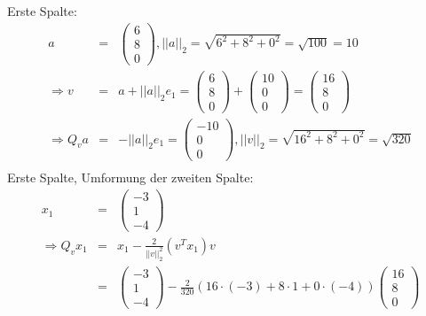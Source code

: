 \documentclass[11pt]{article} %
\begin{document}
\begin{enumerate}[a)]
Erste Spalte:
\begin{eqnarray*}
a &=& \begin{pmatrix} 6 \\ 8 \\ 0 \end{pmatrix}, ||a||_2 = \sqrt{6^2 + 8^2 + 0^2}  = \sqrt{100} =  10 \\
\Rightarrow  v &=& a + ||a||_2e_1 = \begin{pmatrix} 6 \\ 8 \\ 0 \end{pmatrix} +  \begin{pmatrix}  10 \\ 0 \\ 0 \end{pmatrix} = \begin{pmatrix} 16 \\ 8 \\ 0 \end{pmatrix} \\
\Rightarrow Q_va &=& -||a||_2e_1 =\begin{pmatrix}  -10 \\ 0 \\ 0 \end{pmatrix}, ||v||_2 = \sqrt{16^2 + 8^2 + 0^2} = \sqrt{320} \\
\end{eqnarray*}
Erste Spalte, Umformung der zweiten Spalte:
\begin{eqnarray*}
x_1 &=& \begin{pmatrix} -3 \\ 1\\ -4 \end{pmatrix} \\
\Rightarrow Q_vx_1 &=& x_1 - \frac 2 {||v||_2^2}(v^Tx_1)v \\
&=& \begin{pmatrix} -3 \\ 1\\ -4 \end{pmatrix} - \frac 2 {320} (16 \cdot (-3) + 8\cdot 1 + 0 \cdot (-4)) \begin{pmatrix} 16 \\ 8 \\ 0 \end{pmatrix} \\

\end{eqnarray*}
\end{enumerate}
\end{document}
